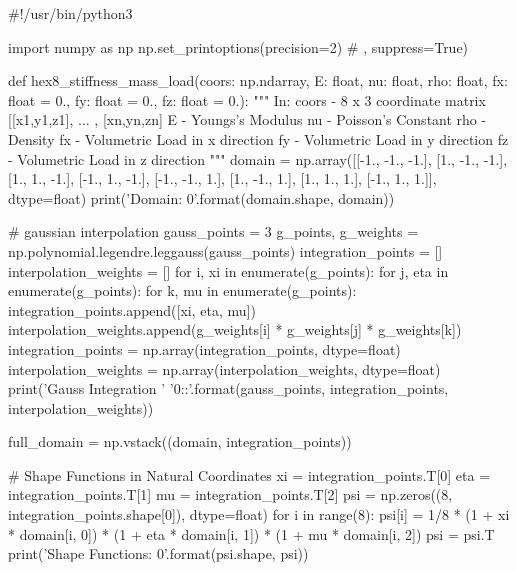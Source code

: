 \begin{python}
#!/usr/bin/python3

import numpy as np
np.set_printoptions(precision=2) # , suppress=True)

def hex8_stiffness_mass_load(coors: np.ndarray,
                             E: float,
                             nu: float,
                             rho: float,
                             fx: float = 0.,
                             fy: float = 0.,
                             fz: float = 0.):
    """
    In:
        coors - 8 x 3 coordinate matrix
                [[x1,y1,z1], ... , [xn,yn,zn]
        E     - Youngs's Modulus
        nu    - Poisson's Constant
        rho   - Density
        fx    - Volumetric Load in x direction
        fy    - Volumetric Load in y direction
        fz    - Volumetric Load in z direction
    """
    domain = np.array([[-1., -1., -1.],
                       [1., -1., -1.],
                       [1., 1., -1.],
                       [-1., 1., -1.],
                       [-1., -1., 1.],
                       [1., -1., 1.],
                       [1., 1., 1.],
                       [-1., 1., 1.]], dtype=float)
    print('Domain: {0}'.format(domain.shape, domain))

    # gaussian interpolation
    gauss_points = 3
    g_points, g_weights = np.polynomial.legendre.leggauss(gauss_points)
    integration_points = []
    interpolation_weights = []
    for i, xi in enumerate(g_points):
        for j, eta in enumerate(g_points):
            for k, mu in enumerate(g_points):
                integration_points.append([xi, eta, mu])
                interpolation_weights.append(g_weights[i] *
                                             g_weights[j] *
                                             g_weights[k])
    integration_points = np.array(integration_points, dtype=float)
    interpolation_weights = np.array(interpolation_weights, dtype=float)
    print('Gauss Integration '
          '{0}:\nWeights:'.format(gauss_points,
                                            integration_points,
                                            interpolation_weights))

    full_domain = np.vstack((domain, integration_points))

    # Shape Functions in Natural Coordinates
    xi = integration_points.T[0]
    eta = integration_points.T[1]
    mu = integration_points.T[2]
    psi = np.zeros((8, integration_points.shape[0]), dtype=float)
    for i in range(8):
        psi[i] = 1/8 * (1 + xi * domain[i, 0]) *
                       (1 + eta * domain[i, 1]) *
                       (1 + mu * domain[i, 2])
    psi = psi.T
    print('Shape Functions: {0}'.format(psi.shape, psi))


\end{python}
